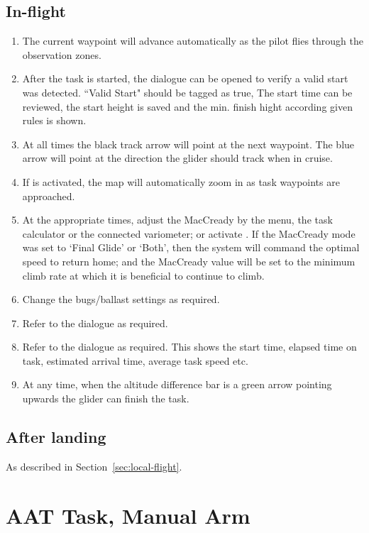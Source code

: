\subsection*{In-flight}
\begin{enumerate}
\item  The current waypoint will advance automatically as the pilot flies
  through the observation zones.
\item  After the task is started, the  dialogue can be opened to
  verify a valid start was detected.  ``Valid Start" should be tagged as true,
  The start time can be reviewed, the start height is saved and the min. finish
  hight according given rules is shown.
\item  At all times the black track arrow will point at the next waypoint.  The
  blue arrow will point at the direction the glider should track when in cruise.
\item  If  is activated, the map will automatically zoom in as
  task waypoints are approached.
\item  At the appropriate times, adjust the MacCready by the menu,
  the task calculator or the connected variometer; or activate .
  If the MacCready mode was set to `Final Glide' or `Both', then the system will
  command the optimal speed to return home; and the MacCready value will be set
  to the minimum climb rate at which it is beneficial to continue to climb.
\item  Change the bugs/ballast settings as required.
\item  Refer to the  dialogue as required.
\item  Refer to the  dialogue as required.  This shows the start
  time, elapsed time on task, estimated arrival time, average task speed etc.
\item  At any time, when the altitude difference bar is a green arrow pointing
  upwards the glider can finish the task.

\end{enumerate}

\subsection*{After landing}
As described in Section~\ref{sec:local-flight}.


\section{AAT Task, Manual Arm}\label{sec:aat-task-manual}

